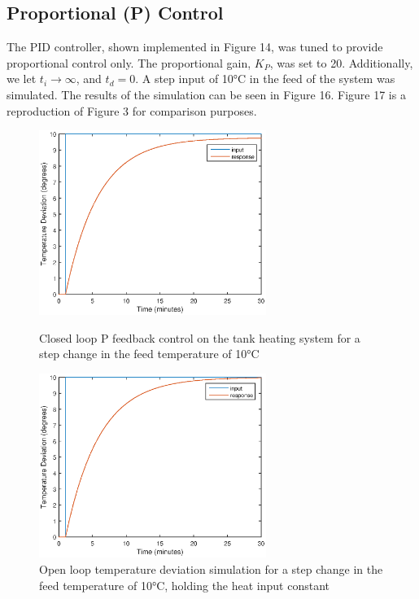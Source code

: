 \documentclass{article}
\begin{document}
\subsection{Proportional (P) Control}
The PID controller, shown implemented in Figure 14, was tuned to provide proportional control only. The proportional gain, $K_P$, was set to 20. Additionally, we let $t_i \rightarrow \infty$, and $t_d = 0$. A step input of 10$\si{\degreeCelsius}$ in the feed of the system was simulated. The results of the simulation can be seen in Figure 16. Figure 17 is a reproduction of Figure 3 for comparison purposes.
\begin{figure}[h]
\begin{minipage}{0.45\textwidth}
\centering
\includegraphics[height=6cm]{3_sim_P}
\caption{Closed loop P feedback control on the tank heating system for a step change in the feed temperature of 10$\si{\degreeCelsius}$}
\end{minipage}
\hspace{1cm}
\begin{minipage}{0.45\textwidth}
\centering
\includegraphics[height=6cm]{1a_sim}
\caption{Open loop temperature deviation simulation for a step change in the feed temperature of 10$\si{\degreeCelsius}$, holding the heat input constant}
\end{minipage}
\end{figure}
\end{document}
